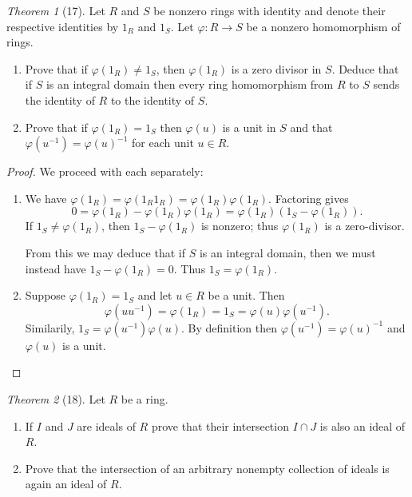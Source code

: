 \documentclass[12pt]{article}
\theoremstyle{remark}
\theoremstyle{named}
\newtheorem*{theorem}{Theorem}
\begin{document}
\begin{theorem}[17]
    Let \(R\) and \(S\) be nonzero rings with identity and denote their respective identities by \(1_R\) and \(1_S\). Let \(\varphi : R \to S\) be a nonzero homomorphism of rings. 
    \begin{enumerate}
        \item Prove that if \(\varphi(1_R) \neq 1_S\), then \(\varphi(1_R)\) is a zero divisor in \(S\). Deduce that if \(S\) is an integral domain then every ring homomorphism from \(R\) to \(S\) sends the identity of \(R\) to the identity of \(S\). 
        \item Prove that if \(\varphi(1_R) = 1_S\) then \(\varphi(u)\) is a unit in \(S\) and that \(\varphi(u^{-1}) = \varphi(u)^{-1}\) for each unit \(u \in R\). 
    \end{enumerate}
\end{theorem}

\begin{proof}
    We proceed with each separately:
    \begin{enumerate}
        \item We have \(\varphi(1_R) = \varphi(1_R 1_R) = \varphi(1_R)\varphi(1_R)\). Factoring gives \[0 = \varphi(1_R) - \varphi(1_R)\varphi(1_R) = \varphi(1_R)(1_S - \varphi(1_R)).\] If \(1_S \neq \varphi(1_R)\), then \(1_S - \varphi(1_R)\) is nonzero; thus \(\varphi(1_R)\) is a zero-divisor.
        
        From this we may deduce that if \(S\) is an integral domain, then we must instead have \(1_S - \varphi(1_R) = 0\). Thus \(1_S = \varphi(1_R)\).

        \item Suppose \(\varphi(1_R) = 1_S\) and let \(u \in R\) be a unit. Then \[\varphi(uu^{-1}) = \varphi(1_R) = 1_S = \varphi(u)\varphi(u^{-1}).\]
        Similarily, \(1_S = \varphi(u^{-1})\varphi(u)\). By definition then \(\varphi(u^{-1}) = \varphi(u)^{-1}\) and \(\varphi(u)\) is a unit.  
    \end{enumerate}
\end{proof}


\begin{theorem}[18]
    Let \(R\) be a ring.
    \begin{enumerate}
        \item If \(I\) and \(J\) are ideals of \(R\) prove that their intersection \(I \cap J\) is also an ideal of \(R\). 
        \item Prove that the intersection of an arbitrary nonempty collection of ideals is again an ideal of \(R\). 
    \end{enumerate}
\end{theorem}
\end{document}
